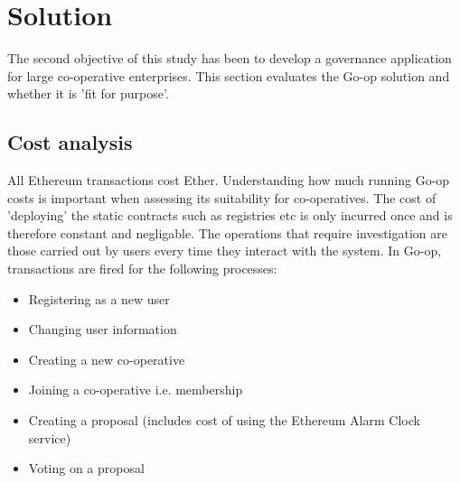 \section{Solution}
The second objective of this study has been to develop a governance application for large co-operative enterprises. This section evaluates the Go-op solution and whether it is 'fit for purpose'.\\

\subsection{Cost analysis}
All Ethereum transactions cost Ether. Understanding how much running Go-op costs is important when assessing its suitability for co-operatives. The cost of 'deploying' the static contracts such as registries etc is only incurred once and is therefore constant and negligable. The operations that require investigation are those carried out by users every time they interact with the system. In Go-op, transactions are fired for the following processes:
\begin{itemize}
\item Registering as a new user
\item Changing user information
\item Creating a new co-operative
\item Joining a co-operative i.e. membership
\item Creating a proposal (includes cost of using the Ethereum Alarm Clock service)
\item Voting on a proposal
\end{itemize}


